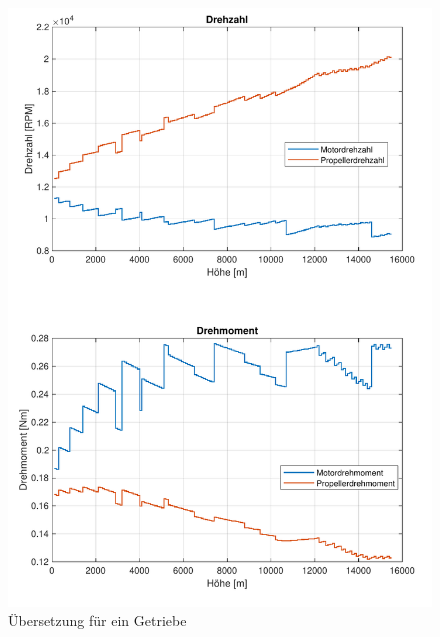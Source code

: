 \begin{appendix}
\begin{figure}[H]
	\includegraphics[scale=0.7]{Diagramme/Dud_KV.pdf}
	\caption{Übersetzung für ein Getriebe}
	\label{abb:getriebe_wirkungsgrade}
\end{figure}

\end{appendix}
